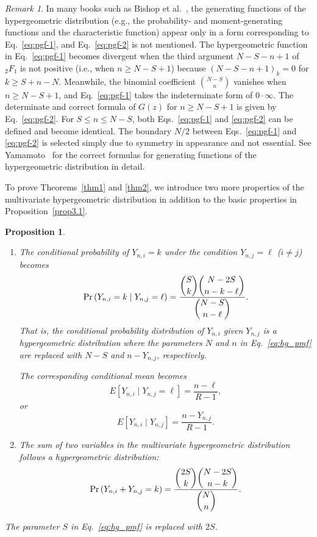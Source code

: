 \documentclass[pre, amsmath, floatfix]{revtex4-2}
\theoremstyle{plain}
\newtheorem{proposition}{Proposition}[section]
\theoremstyle{definition}
\theoremstyle{remark}
\newtheorem{remark}{Remark}[section]
\newcommand{\Prob}[1]{\mathrm{Pr}\left(#1\right)} %
\newcommand{\E}[1]{E\left[#1\right]} %
\newcommand{\GaussFsymbol}{{}_2F_1} %
\begin{document}
\begin{remark}
In many books such as Bishop et al.~\cite{Bishop}, the generating functions of the hypergeometric distribution (e.g., the probability- and moment-generating functions and the characteristic function) appear only in a form corresponding to Eq.~\eqref{eq:pgf-1}, and Eq.~\eqref{eq:pgf-2} is not mentioned.
The hypergeometric function in Eq.~\eqref{eq:pgf-1} becomes divergent when the third argument $N-S-n+1$ of $\GaussFsymbol$ is not positive (i.e., when $n\ge N-S+1$) because $(N-S-n+1)_k=0$ for $k\ge S+n-N$.
Meanwhile, the binomial coefficient $\binom{N-S}{n}$ vanishes when $n\ge N-S+1$, and Eq.~\eqref{eq:pgf-1} takes the indeterminate form of $0\cdot\infty$.
The determinate and correct formula of $G(z)$ for $n\ge N-S+1$ is given by Eq.~\eqref{eq:pgf-2}.
For $S\le n\le N-S$, both Eqs.~\eqref{eq:pgf-1} and \eqref{eq:pgf-2} can be defined and become identical.
The boundary $N/2$ between Eqs.~\eqref{eq:pgf-1} and \eqref{eq:pgf-2} is selected simply due to symmetry in appearance and not essential.
See Yamamoto~\cite{Yamamoto} for the correct formulas for generating functions of the hypergeometric distribution in detail.
\end{remark}

To prove Theorems~\ref{thm1} and \ref{thm2}, we introduce two more properties of the multivariate hypergeometric distribution in addition to the basic properties in Proposition~\ref{prop3.1}.

\begin{proposition}\label{prop3.4}
\begin{enumerate}
\renewcommand{\labelenumi}{$(\mathrm{\alph{enumi}})$}
\renewcommand{\theenumi}{\labelenumi}
\item\label{prop3.4-a}
The conditional probability of $Y_{n,i}=k$ under the condition $Y_{n,j}=\ell$ \textup{(}$i\ne j$\textup{)} becomes
\[
\Prob{Y_{n,i}=k\mid Y_{n,j}=\ell}=\frac{\dbinom{S}{k}\dbinom{N-2S}{n-k-\ell}}{\dbinom{N-S}{n-\ell}}.
\]
That is, the conditional probability distribution of $Y_{n,i}$ given $Y_{n,j}$ is a hypergeometric distribution where the parameters $N$ and $n$ in Eq.~\eqref{eq:hg_pmf} are replaced with $N-S$ and $n-Y_{n,j}$, respectively.

The corresponding conditional mean becomes
\[
\E{Y_{n,i}\mid Y_{n,j}=\ell}=\frac{n-\ell}{R-1},
\]
or
\[
\E{Y_{n,i}\mid Y_{n,j}}=\frac{n-Y_{n,j}}{R-1}.
\]

\item\label{prop3.4-b}
The sum of two variables in the multivariate hypergeometric distribution follows a hypergeometric distribution:
\[
\Prob{Y_{n,i}+Y_{n,j}=k}=\frac{\dbinom{2S}{k}\dbinom{N-2S}{n-k}}{\dbinom{N}{n}}.
\]
\end{enumerate}
The parameter $S$ in Eq.~\eqref{eq:hg_pmf} is replaced with $2S$.
\end{proposition}
\end{document}
